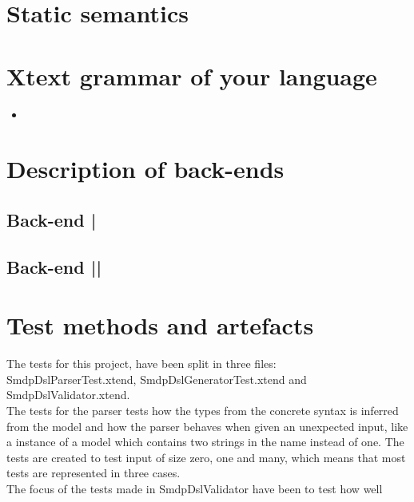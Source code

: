 \documentclass[paper=a4, fontsize=11pt]{scrartcl} %
\numberwithin{equation}{section} %
\numberwithin{figure}{section} %
\numberwithin{table}{section} %
\newcommand{\java}[2]{
\begin{itemize}
\item[]
\end{itemize}
}
\begin{document}
\section{Static semantics}

\section{Xtext grammar of your language}
\java{../configproject/xtext/org.xtext.example.smdpdsl/src/org/xtext/example/mydsl/SmdpDsl.xtext}{static}

\section{Description of back-ends}
\subsection{Back-end |}
\subsection{Back-end ||}

\section{Test methods and artefacts}
The tests for this project, have been split in three files: SmdpDslParserTest.xtend, SmdpDslGeneratorTest.xtend and SmdpDslValidator.xtend.\\
The tests for the parser tests how the types from the concrete syntax is inferred from the model and how the parser behaves when given an unexpected input, like a instance of a model which contains two strings in the name instead of one. The tests are created to test input of size zero, one and many, which means that most tests are represented in three cases.\\
The focus of the tests made in SmdpDslValidator have been to test how well  
\end{document}

